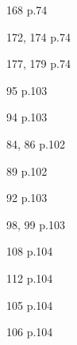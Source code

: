 \documentclass[10pt,a4paper,openany,twoside,prof]{book}
\begin{document}
\begin{bookexo}{168 p.74}\end{bookexo}
\begin{bookexos}{172, 174 p.74}\end{bookexos}
\begin{bookexos}{177, 179 p.74}\end{bookexos}

\begin{bookexo}{95 p.103}\end{bookexo}
\begin{bookexo}{94 p.103}\end{bookexo}
\begin{bookexos}{84, 86 p.102}\end{bookexos}
\begin{bookexo}{89 p.102}\end{bookexo}
\begin{bookexo}{92 p.103}\end{bookexo}

\begin{bookexos}{98, 99 p.103}\end{bookexos}
\begin{bookexo}{108 p.104}\end{bookexo}
\begin{bookexo}{112 p.104}\end{bookexo}
\begin{bookexo}{105 p.104}\end{bookexo}
\begin{bookexo}{106 p.104}\end{bookexo}

\newpage

\chapnumber{}
\setcounter{sectionexo}{0}
\thispagestyle{premierepage}
\enteteperso

\end{document}
